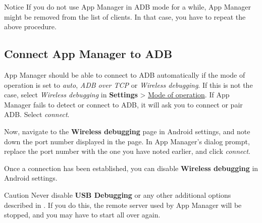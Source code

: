 \begin{tip}{Notice}
    If you do not use App Manager in ADB mode for a while, App Manager might be removed from the
    list of clients. In that case, you have to repeat the above procedure.
\end{tip}

\subsection{Connect App Manager to ADB}\label{subsec:connect-app-manager-to-adb} %
App Manager should be able to connect to ADB automatically if the mode of operation is set to
\textit{auto}, \textit{ADB over TCP} or \textit{Wireless debugging}. If this is not the case, select
\textit{Wireless debugging} in \textbf{Settings} > \hyperref[subsec:mode-of-operation]{Mode of operation}.
If App Manager fails to detect or connect to ADB, it will ask you to connect or pair ADB. Select
\textit{connect}.

Now, navigate to the \textbf{Wireless debugging} page in Android settings, and note down the port
number displayed in the page. In App Manager's dialog prompt, replace the port number with the one
you have noted earlier, and click \textit{connect}.

Once a connection has been established, you can disable \textbf{Wireless debugging} in Android settings.

\begin{danger}{Caution}
    Never disable \textbf{USB Debugging} or any other additional options described in .
    If you do this, the remote server used by App Manager will be stopped, and you may have to start all over again.
\end{danger}
